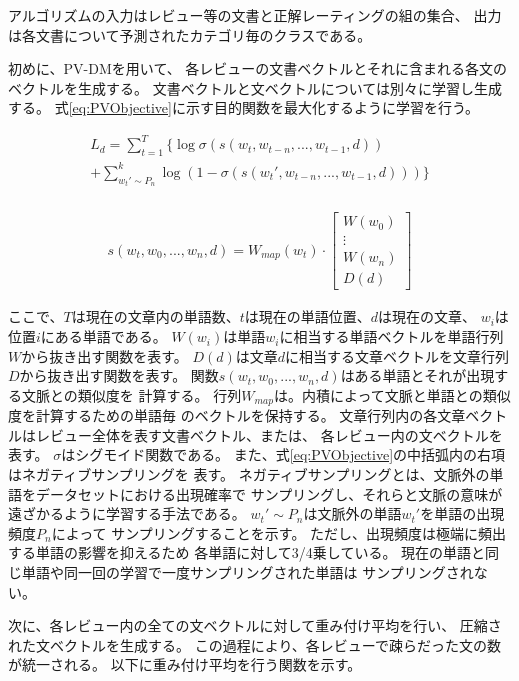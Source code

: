 \documentclass[twocolumn,a4paper]{ltjarticle}
\begin{document}
アルゴリズムの入力はレビュー等の文書と正解レーティングの組の集合、
出力は各文書について予測されたカテゴリ毎のクラスである。

初めに、PV-DMを用いて、
各レビューの文書ベクトルとそれに含まれる各文のベクトルを生成する。
文書ベクトルと文ベクトルについては別々に学習し生成する。
式\ref{eq:PVObjective}に示す目的関数を最大化するように学習を行う。

\begin{multline}
  L_d = \sum^{T}_{t = 1} \{ \log \sigma(s(w_t, w_{t-n}, ..., w_{t-1}, d)) \\
        + \sum^{k}_{w_{t}' \sim P_n}
          \log(1 - \sigma(s(w_{t}', w_{t-n}, ..., w_{t-1}, d))) \}
  \label{eq:PVObjective} \\
\end{multline}

\begin{gather}
  s(w_t, w_0, ..., w_n, d)
    = W_{map}(w_t)
      \cdot \begin{bmatrix} W(w_0) \\ \vdots \\ W(w_n) \\ D(d) \end{bmatrix}
\end{gather}

ここで、$T$は現在の文章内の単語数、$t$は現在の単語位置、$d$は現在の文章、
$w_i$は位置$i$にある単語である。
$W(w_i)$は単語$w_i$に相当する単語ベクトルを単語行列$W$から抜き出す関数を表す。
$D(d)$は文章$d$に相当する文章ベクトルを文章行列$D$から抜き出す関数を表す。
関数$s(w_t, w_0, ..., w_n, d)$はある単語とそれが出現する文脈との類似度を
計算する。
行列$W_{map}$は。内積によって文脈と単語との類似度を計算するための単語毎
のベクトルを保持する。
文章行列内の各文章ベクトルはレビュー全体を表す文書ベクトル、または、
各レビュー内の文ベクトルを表す。
$\sigma$はシグモイド関数である。
また、式\ref{eq:PVObjective}の中括弧内の右項はネガティブサンプリングを
表す。
ネガティブサンプリングとは、文脈外の単語をデータセットにおける出現確率で
サンプリングし、それらと文脈の意味が遠ざかるように学習する手法である。
$w_{t}' \sim P_n$は文脈外の単語$w_{t}'$を単語の出現頻度$P_n$によって
サンプリングすることを示す。
ただし、出現頻度は極端に頻出する単語の影響を抑えるため
各単語に対して3/4乗している。
現在の単語と同じ単語や同一回の学習で一度サンプリングされた単語は
サンプリングされない。

次に、各レビュー内の全ての文ベクトルに対して重み付け平均を行い、
圧縮された文ベクトルを生成する。
この過程により、各レビューで疎らだった文の数が統一される。
以下に重み付け平均を行う関数を示す。
\end{document}

